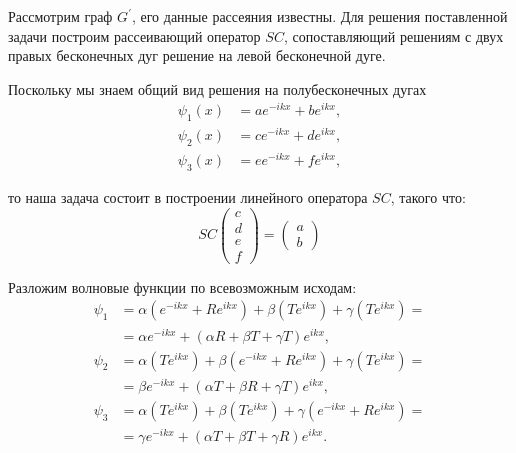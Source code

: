 \documentclass[a4 paper, 12 pt]{extarticle}
\begin{document}
   Рассмотрим граф $G^\prime$, его данные рассеяния известны. Для решения поставленной задачи построим рассеивающий оператор $SC$, сопоставляющий решениям с двух правых бесконечных дуг решение на левой бесконечной дуге.
   
   Поскольку мы знаем общий вид решения на полубесконечных дугах
   \begin{equation}
   \begin{split}
   \label{GeneralSolution1}
   \psi_1\left(x\right) &= a e^{-ikx} + b e^{ikx}, \\
   \psi_2\left(x\right) &= c e^{-ikx} + d e^{ikx}, \\
   \psi_3\left(x\right) &= e e^{-ikx} + f e^{ikx},
   \end{split}
   \end{equation}

   то наша задача состоит в построении линейного оператора $SC$, такого что:
   \[SC\left(
   \begin{array}{c}
   c \\
   d \\
   e \\
   f
   \end{array}\right) = \left(\begin{array}{c}
   a \\
   b
   \end{array}\right)\]
   
   Разложим волновые функции по всевозможным исходам:
   \begin{equation}
   \label{GenetalSolution2}
   \begin{aligned}
   \psi_1 &= \alpha\left(e^{-ikx} + Re^{ikx}\right) + \beta\left(Te^{ikx}\right) + \gamma \left(Te^{ikx}\right) = \\
   &= \alpha e^{-ikx} + \left(\alpha R + \beta T + \gamma T\right) e^{ikx}, \\
   \psi_2 &= \alpha \left(T e^{ikx}\right) + \beta \left(e^{-ikx} + R e^{ikx}\right) + \gamma \left(T e^{ikx}\right) = \\
   &= \beta e^{-ikx} + \left(\alpha T + \beta R + \gamma T\right) e^{ikx}, \\
   \psi_3 &= \alpha \left(T e^{ikx}\right) + \beta \left(T e^{ikx}\right) + \gamma \left(e^{-ikx} + R e^{ikx}\right) = \\
   &= \gamma e^{-ikx} + \left(\alpha T + \beta T + \gamma R\right) e^{ikx}.
   \end{aligned}
   \end{equation}
   
\end{document}
